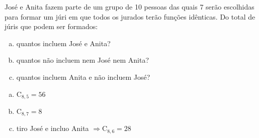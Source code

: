 \begin{ex}
José e Anita fazem parte de um grupo de 10 pessoas das quais 7 serão escolhidas para formar um júri em que todos os jurados terão funções idênticas. Do total de júris que podem ser formados:
   \begin{enumerate}[(a)]
   \item quantos incluem José e Anita?
   \item quantos não incluem nem José nem Anita?  
   \item quantos incluem Anita e não incluem José?
   \end{enumerate}
     \begin{sol}
      \phantom{A} 
        \begin{enumerate} [(a)] 
            \item $\mathrm{C}_{8,5}=56$
            \item $\mathrm{C}_{8,7}=8$
            \item tiro José e incluo Anita \hspace{0,3cm} $\Longrightarrow \mathrm{C}_{8,6}=28$
        \end{enumerate}
     \end{sol}
\end{ex}